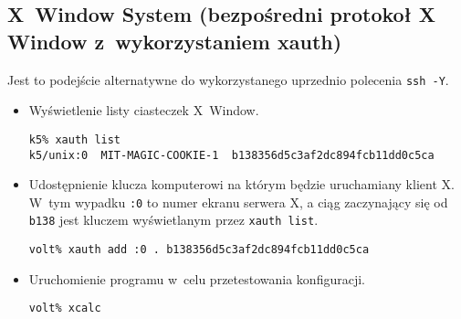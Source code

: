 \documentclass[a4paper,11pt]{article}
\begin{document}
\subsection{X~Window System (bezpośredni protokoł X Window z~wykorzystaniem xauth)}
Jest to podejście alternatywne do wykorzystanego uprzednio polecenia \verb|ssh -Y|.
\begin{itemize}

\item Wyświetlenie listy ciasteczek X~Window.

\begin{verbatim}
k5% xauth list
k5/unix:0  MIT-MAGIC-COOKIE-1  b138356d5c3af2dc894fcb11dd0c5ca
\end{verbatim}

\item Udostępnienie klucza komputerowi na którym będzie uruchamiany klient X.
      W~tym wypadku \verb|:0| to numer ekranu serwera X, a ciąg zaczynający
      się od \verb|b138| jest kluczem wyświetlanym przez \verb|xauth list|.

\begin{verbatim}
volt% xauth add :0 . b138356d5c3af2dc894fcb11dd0c5ca
\end{verbatim}

\item Uruchomienie programu w~celu przetestowania konfiguracji.

\begin{verbatim}
volt% xcalc
\end{verbatim}

\end{itemize}
\end{document}
